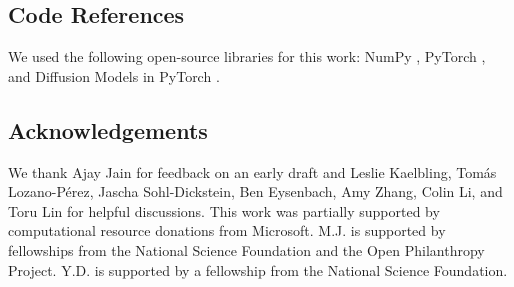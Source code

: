 \subsection*{Code References}
We used the following open-source libraries for this work: NumPy \citep{harris2020numpy}, PyTorch \citep{paszke2019pytorch}, and Diffusion Models in PyTorch \citep{wang2020ddpm}.

\subsection*{Acknowledgements}
We thank Ajay Jain for feedback on an early draft and Leslie Kaelbling, Tom\'as Lozano-P\'erez, Jascha Sohl-Dickstein, Ben Eysenbach, Amy Zhang, Colin Li, and Toru Lin for helpful discussions.
This work was partially supported by computational resource donations from Microsoft.
M.J. is supported by fellowships from the National Science Foundation and the Open Philanthropy Project.
Y.D. is supported by a fellowship from the National Science Foundation.